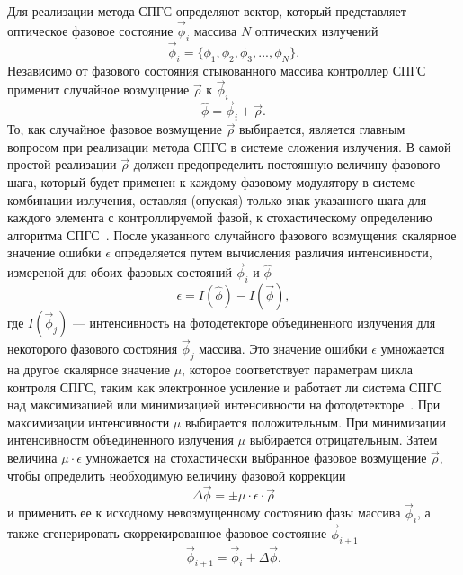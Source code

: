 Для реализации метода СПГС определяют вектор, который представляет оптическое фазовое состояние $\vec\phi_i$ массива $N$ оптических излучений~\cite{Locset31}
\begin{equation}\label{eq_locset_2.3}
  \vec\phi_i=\{\phi_1,\phi_2,\phi_3,...,\phi_N\}.
\end{equation}
Независимо от фазового состояния стыкованного массива контроллер СПГС применит случайное возмущение $\vec\rho$ к $\vec\phi_i$
\begin{equation}\label{eq_locset_2.4}
  \hat\phi=\vec\phi_i+\vec\rho.
\end{equation}
То, как случайное фазовое возмущение $\vec\rho$ выбирается, является главным вопросом при реализации метода СПГС в системе сложения излучения. В самой простой реализации $\vec\rho$ должен предопределить постоянную величину фазового шага, который будет применен к каждому фазовому модулятору в системе комбинации излучения, оставляя (опуская) только знак указанного шага для каждого элемента с контроллируемой фазой, к стохастическому определению алгоритма СПГС~\cite{Locset31}. После указанного случайного фазового возмущения скалярное значение ошибки $\epsilon$ определяется путем вычисления различия интенсивности, измереной для обоих фазовых состояний $\vec\phi_i$ и $\hat\phi$
\begin{equation}\label{eq_locset_2.5}
  \epsilon=I(\hat\phi)-I(\vec\phi),
\end{equation}
где $I(\vec\phi_j)$ --- интенсивность на фотодетекторе объединенного излучения для некоторого фазового состояния $\vec\phi_j$ массива. Это значение ошибки $\epsilon$ умножается на другое скалярное значение $\mu$, которое соответствует параметрам цикла контроля  СПГС, таким как электронное усиление и работает ли система СПГС над максимизацией или минимизацией интенсивности на фотодетекторе~\cite{Locset25}. При максимизации интенсивности $\mu$ выбирается положительным. При минимизации интенсивностм объединенного излучения $\mu$ выбирается отрицательным. Затем величина $\mu\cdot\epsilon$ умножается на стохастически выбранное фазовое возмущение $\vec\rho$, чтобы определить необходимую величину фазовой коррекции
\begin{equation}\label{eq_locset_2.6}
  \Delta\vec\phi=\pm\mu\cdot\epsilon\cdot\vec\rho
\end{equation}
и применить ее к исходному невозмущенному состоянию фазы массива $\vec\phi_i$, а также сгенерировать скоррекированное фазовое состояние $\vec\phi_{i+1}$
\begin{equation}\label{eq_locset_2.7}
  \vec\phi_{i+1}=\vec\phi_i+\Delta\vec\phi.
\end{equation}

